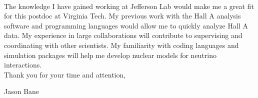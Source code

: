 \documentclass[12pt,letterpaper]{article}
\begin{document}
\paragraph{}The knowledge I have gained working at Jefferson Lab would make me a great fit for this postdoc at Virginia Tech. My previous work with the Hall A analysis software and programming languages would allow me to quickly analyze Hall A data. My experience in large collaborations will  contribute to supervising and coordinating with other scientists. My familiarity with coding languages and simulation packages will help me develop nuclear models for neutrino interactions.\\

Thank you for your time and attention,

Jason Bane

\newpage
\end{document}
